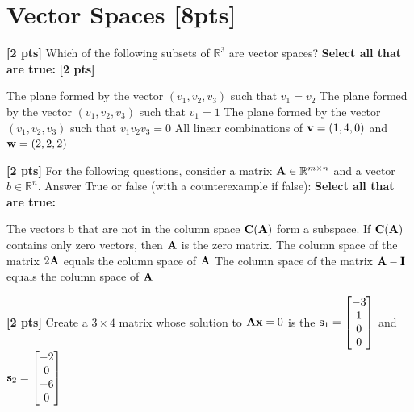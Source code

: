 \documentclass[11pt,addpoints,answers]{exam}
\numberwithin{equation}{section} %
\numberwithin{figure}{section} %
\numberwithin{table}{section} %
\begin{document}
\clearpage


\section{Vector Spaces  [8pts]}
\begin{questions}

\question \textbf{[2 pts]} Which of the following subsets of $\mathbb{R}^3$ are vector spaces?
    \textbf{Select all that are true:} \textbf{[2 pts]}
    \checkboxchar{$\Box$} \checkedchar{$\blacksquare$}
    \begin{checkboxes}
        \choice The plane formed by the vector $(v_1, v_2, v_3) $ such that $v_1 = v_2$
        \choice The plane formed by the vector $(v_1, v_2, v_3) $ such that $v_1 = 1$
        \choice The plane formed by the vector $(v_1, v_2, v_3) $  such that $v_1 v_2 v_3 = 0$
        \choice All linear combinations of $\mathbf{v} = (1, 4, 0)$ and $\mathbf{w} = (2, 2, 2)$
    \end{checkboxes}

\question \textbf{[2 pts]} For the following questions, consider a matrix $\mathbf{A} \in \mathbb{R}^{m \times n}$ and a vector $b \in \mathbb{R}^n$. Answer True or false (with a counterexample if false):
    \textbf{Select all that are true:} 
    \begin{checkboxes}
        \choice The vectors b that are not in the column space $\mathbf{C}(\mathbf{A})$ form a subspace.
        \choice If $\mathbf{C}(\mathbf{A})$ contains only zero vectors, then $\mathbf{A}$ is the zero matrix.
        \choice The column space of the matrix $2\mathbf{A}$ equals the column space of $\mathbf{A}$
        \choice The column space of the matrix $\mathbf{A} - \mathbf{I}$ equals the column space of $\mathbf{A}$
    \end{checkboxes}

\question \textbf{[2 pts]} Create a $3 \times 4$ matrix whose solution to $\mathbf{A} \mathbf{x} = 0$ is the $\mathbf{s}_1=\begin{bmatrix}
         -3 \\
         1 \\
         0 \\
         0
        \end{bmatrix}$ and $\mathbf{s}_2=\begin{bmatrix}
         -2 \\
         0 \\
         -6 \\
         0
        \end{bmatrix}$


\end{questions}
\end{document}
